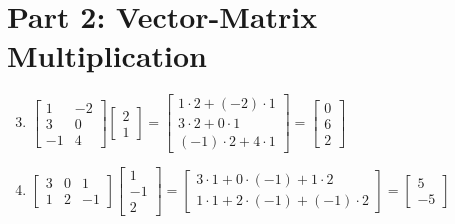 \documentclass{article}
\begin{document}
\section*{Part 2: Vector-Matrix Multiplication}
\begin{enumerate}
\setcounter{enumi}{2}
\item $\begin{bmatrix} 1 & -2 \\ 3 & 0 \\ -1 & 4 \end{bmatrix} \begin{bmatrix} 2 \\ 1 \end{bmatrix} = \begin{bmatrix} 1\cdot2 + (-2)\cdot1 \\ 3\cdot2 + 0\cdot1 \\ (-1)\cdot2 + 4\cdot1 \end{bmatrix} = \boxed{\begin{bmatrix} 0 \\ 6 \\ 2 \end{bmatrix}}$

\item $\begin{bmatrix} 3 & 0 & 1 \\ 1 & 2 & -1 \end{bmatrix} \begin{bmatrix} 1 \\ -1 \\ 2 \end{bmatrix} = \begin{bmatrix} 3\cdot1 + 0\cdot(-1) + 1\cdot2 \\ 1\cdot1 + 2\cdot(-1) + (-1)\cdot2 \end{bmatrix} = \boxed{\begin{bmatrix} 5 \\ -5 \end{bmatrix}}$
\end{enumerate}
\end{document}
